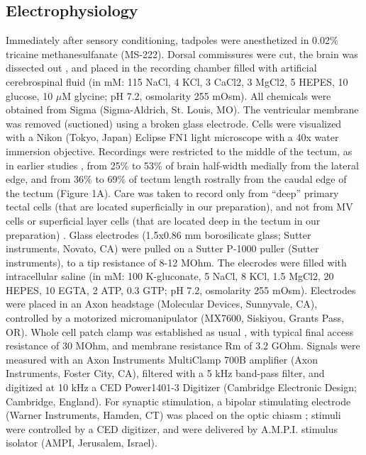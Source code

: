 \documentclass{article}
\begin{document}
\subsection*{Electrophysiology}

Immediately after sensory conditioning, tadpoles were anesthetized in 0.02\% tricaine methanesulfanate (MS-222). Dorsal commissures were cut, the brain was dissected out \citep{aizenman2003,ciarleglio2015}, and placed in the recording chamber filled with artificial cerebrospinal fluid (in mM: 115 NaCl, 4 KCl, 3 CaCl2, 3 MgCl2, 5 HEPES, 10 glucose, 10 $\mu$M glycine; pH 7.2, osmolarity 255 mOsm). All chemicals were obtained from Sigma (Sigma-Aldrich, St. Louis, MO). The ventricular membrane was removed (suctioned) using a broken glass electrode. Cells were visualized with a Nikon (Tokyo, Japan) Eclipse FN1 light microscope with a 40x water immersion objective. Recordings were restricted to the middle of the tectum, as in earlier studies \citep{ciarleglio2015}, from 25\% to 53\% of brain half-width medially from the lateral edge, and from 36\% to 69\% of tectum length rostrally from the caudal edge of the tectum (Figure 1A). Care was taken to record only from “deep” primary tectal cells (that are located superficially in our preparation), and not from MV cells \citep{pratt2009trigeminal} or superficial layer cells (that are located deep in the tectum in our preparation) \citep{liu2016}. Glass electrodes (1.5x0.86 mm borosilicate glass; Sutter instruments, Novato, CA) were pulled on a Sutter P-1000 puller (Sutter instruments), to a tip resistance of 8-12 MOhm. The elecrodes were filled with intracellular saline (in mM: 100 K-gluconate, 5 NaCl, 8 KCl, 1.5 MgCl2, 20 HEPES, 10 EGTA, 2 ATP, 0.3 GTP; pH 7.2, osmolarity 255 mOsm). Electrodes were placed in an Axon headstage (Molecular Devices, Sunnyvale, CA), controlled by a motorized micromanipulator (MX7600, Siskiyou, Grants Pass, OR). Whole cell patch clamp was established as usual \citep{ciarleglio2015}, with typical final access resistance of 30 MOhm, and membrane resistance Rm of 3.2 GOhm. Signals were measured with an Axon Instruments MultiClamp 700B amplifier (Axon Instruments, Foster City, CA), filtered with a 5 kHz band-pass filter, and digitized at 10 kHz a CED Power1401-3 Digitizer (Cambridge Electronic Design; Cambridge, England). For synaptic stimulation, a bipolar stimulating electrode (Warner Instruments, Hamden, CT) was placed on the optic chiasm \citep{wu1996}; stimuli were controlled by a CED digitizer, and were delivered by A.M.P.I. stimulus isolator (AMPI, Jerusalem, Israel).
\end{document}
